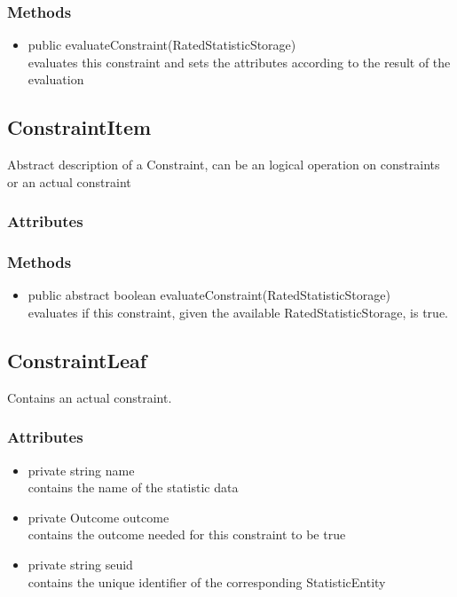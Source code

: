 \subsubsection{Methods}
\begin{itemize}
	\item public evaluateConstraint(RatedStatisticStorage) \\
	evaluates this constraint and sets the attributes according to the result of the evaluation
\end{itemize}



\subsection{ConstraintItem}
	Abstract description of a Constraint, can be an logical operation on constraints or an actual constraint
\subsubsection{Attributes}
\subsubsection{Methods}
\begin{itemize}
	\item public abstract boolean evaluateConstraint(RatedStatisticStorage)\\
	evaluates if this constraint, given the available RatedStatisticStorage, is true. 
\end{itemize}		


\subsection{ConstraintLeaf }
Contains an actual constraint.

\subsubsection{Attributes}
\begin{itemize}
	\item private  string name\\
	contains the name of the statistic data
	\item private  Outcome outcome\\
	contains the outcome needed for this constraint to be true
	\item private  string seuid\\
	contains the unique identifier of the corresponding StatisticEntity
\end{itemize}
